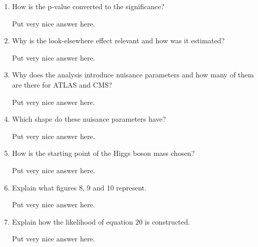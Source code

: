 \documentclass[10pt]{article}
\newenvironment{myfont}{\fontfamily{put}\selectfont}{\par}
\begin{document}
\begin{myfont}
\begin{enumerate}
  \item How is the p-value converted to the significance?

  \noindent Put very nice answer here.

  \item Why is the look-elsewhere effect relevant and how was it estimated?

  \noindent Put very nice answer here.

  \item Why does the analysis introduce nuisance parameters and how many of them are there for ATLAS and CMS?

  \noindent Put very nice answer here.

  \item Which shape do these nuisance parameters have?

  \noindent Put very nice answer here.

  \item How is the starting point of the Higgs boson mass chosen?

  \noindent Put very nice answer here.

  \item Explain what figures 8, 9 and 10 represent.

  \noindent Put very nice answer here.

  \item Explain how the likelihood of equation 20 is constructed.

  \noindent Put very nice answer here.
\end{enumerate}


\end{myfont}
\end{document}
